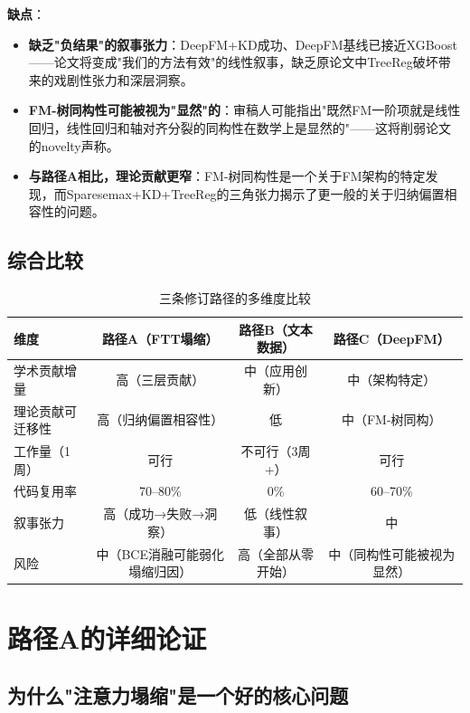 \documentclass[UTF8,a4paper,12pt,fontset=fandol]{ctexart}
\begin{document}
\textbf{缺点}：
\begin{itemize}
    \item \textbf{缺乏"负结果"的叙事张力}：DeepFM+KD成功、DeepFM基线已接近XGBoost——论文将变成"我们的方法有效"的线性叙事，缺乏原论文中TreeReg破坏带来的戏剧性张力和深层洞察。
    \item \textbf{FM-树同构性可能被视为"显然"的}：审稿人可能指出"既然FM一阶项就是线性回归，线性回归和轴对齐分裂的同构性在数学上是显然的"——这将削弱论文的novelty声称。
    \item \textbf{与路径A相比，理论贡献更窄}：FM-树同构性是一个关于FM架构的特定发现，而Sparesemax+KD+TreeReg的三角张力揭示了更一般的关于归纳偏置相容性的问题。
\end{itemize}

\subsection{综合比较}

\begin{table}[htbp]
\centering
\caption{三条修订路径的多维度比较}
\label{tab:path_comparison}
\begin{tabular}{lccc}
\toprule
\textbf{维度} & \textbf{路径A（FTT塌缩）} & \textbf{路径B（文本数据）} & \textbf{路径C（DeepFM）} \\
\midrule
学术贡献增量 & 高（三层贡献） & 中（应用创新） & 中（架构特定） \\
理论贡献可迁移性 & 高（归纳偏置相容性） & 低 & 中（FM-树同构） \\
工作量（1周） & 可行 & 不可行（3周+） & 可行 \\
代码复用率 & 70--80\% & 0\% & 60--70\% \\
叙事张力 & 高（成功→失败→洞察） & 低（线性叙事） & 中 \\
风险 & 中（BCE消融可能弱化塌缩归因） & 高（全部从零开始） & 中（同构性可能被视为显然） \\
\bottomrule
\end{tabular}
\end{table}

\section{路径A的详细论证}

\subsection{为什么"注意力塌缩"是一个好的核心问题}
\end{document}
